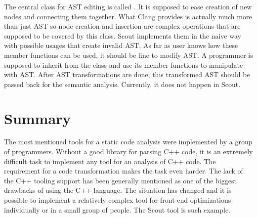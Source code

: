 The central class for AST editing is called . It is supposed to ease creation of new nodes and connecting them together. What Clang provides is actually much more than just AST so node creation and insertion are complex operations that are supposed to be covered by this class. Scout implements them in the naive way with possible usages that create invalid AST. As far as user knows how these member functions can be used, it should be fine to modify AST. A programmer is supposed to inherit from the  class and use its member functions to manipulate with AST. After AST transformations are done, this transformed AST should be passed back for the semantic analysis. Currently, it does not happen in Scout.

\section{Summary}
The most mentioned tools for a static code analysis were implemented by a group of programmers. Without a good library for parsing C++ code, it is an extremely difficult task to implement any tool for an analysis of C++ code. The requirement for a code transformation makes the task even harder. The lack of the C++ tooling support has been generally mentioned as one of the biggest drawbacks of using the C++ language. The situation has changed and it is possible to implement a relatively complex tool for front-end optimizations individually or in a small group of people. The Scout tool is such example.